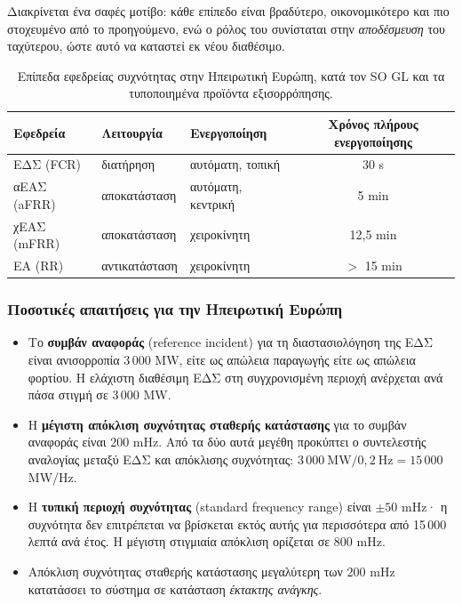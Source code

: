 Διακρίνεται ένα σαφές μοτίβο: κάθε επίπεδο είναι βραδύτερο, οικονομικότερο και πιο
στοχευμένο από το προηγούμενο, ενώ ο ρόλος του συνίσταται στην \emph{αποδέσμευση} του
ταχύτερου, ώστε αυτό να καταστεί εκ νέου διαθέσιμο.

\begin{table}[!htbp]
\centering
\begin{tabular}{lllc}
\hline
Εφεδρεία & Λειτουργία & Ενεργοποίηση & Χρόνος πλήρους ενεργοποίησης \\
\hline
ΕΔΣ (FCR)   & διατήρηση      & αυτόματη, τοπική   & 30 s \\
αΕΑΣ (aFRR) & αποκατάσταση   & αυτόματη, κεντρική & 5 min \\
χΕΑΣ (mFRR) & αποκατάσταση   & χειροκίνητη        & 12,5 min \\
ΕΑ (RR)     & αντικατάσταση  & χειροκίνητη        & $>$ 15 min \\
\hline
\end{tabular}
\caption{Επίπεδα εφεδρείας συχνότητας στην Ηπειρωτική Ευρώπη, κατά τον SO GL και τα
τυποποιημένα προϊόντα εξισορρόπησης.}
\label{tab:reserves}
\end{table}

\subsubsection*{Ποσοτικές απαιτήσεις για την Ηπειρωτική Ευρώπη}

\begin{itemize}
\item Το \textbf{συμβάν αναφοράς} (reference incident) για τη διαστασιολόγηση της ΕΔΣ είναι
      ανισορροπία 3\,000 MW, είτε ως απώλεια παραγωγής είτε ως απώλεια φορτίου. Η ελάχιστη
      διαθέσιμη ΕΔΣ στη συγχρονισμένη περιοχή ανέρχεται ανά πάσα στιγμή σε 3\,000 MW.
\item Η \textbf{μέγιστη απόκλιση συχνότητας σταθερής κατάστασης} για το συμβάν αναφοράς
      είναι 200 mHz. Από τα δύο αυτά μεγέθη προκύπτει ο συντελεστής αναλογίας μεταξύ ΕΔΣ
      και απόκλισης συχνότητας: $3\,000\ \text{MW} / 0{,}2\ \text{Hz} = 15\,000$ MW/Hz.
\item Η \textbf{τυπική περιοχή συχνότητας} (standard frequency range) είναι $\pm 50$ mHz·
      η συχνότητα δεν επιτρέπεται να βρίσκεται εκτός αυτής για περισσότερα από
      15\,000 λεπτά ανά έτος. Η μέγιστη στιγμιαία απόκλιση
      ορίζεται σε 800 mHz.
\item Απόκλιση συχνότητας σταθερής κατάστασης μεγαλύτερη των 200 mHz κατατάσσει το
      σύστημα σε κατάσταση \emph{έκτακτης ανάγκης}.
\end{itemize}

